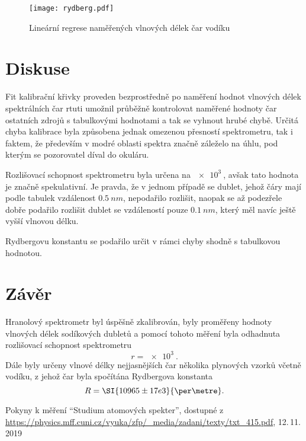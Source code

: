 \documentclass{scirep}
\begin{document}
    \begin{figure}[b]
        \centering
        \texttt{[image: rydberg.pdf]}
        \caption{Lineární regrese naměřených vlnových délek čar vodíku}
        \label{fig:rydberg}
    \end{figure}

    \section*{Diskuse}

    Fit kalibrační křivky proveden bezprostředně po naměření hodnot vlnových délek spektrálních čar rtuti umožnil průběžně kontrolovat naměřené hodnoty čar ostatních zdrojů s tabulkovými hodnotami a tak se vyhnout hrubé chybě.
    Určitá chyba kalibrace byla způsobena jednak omezenou přesností spektrometru, tak i faktem, že především v modré oblasti spektra značně záleželo na úhlu, pod kterým se pozorovatel díval do okuláru.

    Rozlišovací schopnost spektrometru byla určena na $\SI{e3}{}$, avšak tato hodnota je značně spekulativní.
    Je pravda, že v jednom případě se dublet, jehož čáry mají podle tabulek vzdálenost $\SI{0.5}{nm}$, nepodařilo rozlišit, naopak se až podezřele dobře podařilo rozlišit dublet se vzdáleností pouze $\SI{0.1}{nm}$, který měl navíc ještě vyšší vlnovou délku.

    Rydbergovu konstantu se podařilo určit v rámci chyby shodně s tabulkovou hodnotou.



    \section*{Závěr}

    Hranolový spektrometr byl úspěšně zkalibrován, byly proměřeny hodnoty vlnových délek sodíkových dubletů a pomocí tohoto měření byla odhadnuta rozlišovací schopnost spektrometru
    \[r = \SI{e3}{}.\]
    Dále byly určeny vlnové délky nejjasnějších čar několika plynových vzorků včetně vodíku, z jehož čar byla spočítána Rydbergova konstanta
    \[ R = \SI{10965 \pm 17 e3}{\per\metre}. \]

    \begin{thebibliography}{}

        Pokyny k měření ``Studium atomových spekter'', dostupné z\\ \url{https://physics.mff.cuni.cz/vyuka/zfp/_media/zadani/texty/txt_415.pdf}, 12.\,11.\,2019

    \end{thebibliography}
\end{document}
